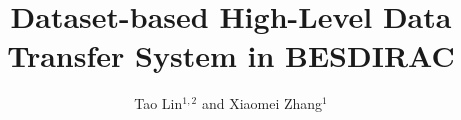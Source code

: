 \documentclass[a4paper]{jpconf}
\begin{document}
\title{Dataset-based High-Level Data Transfer System in BESDIRAC}

\author{Tao Lin$^{1,2}$ and Xiaomei Zhang$^1$}
\address{$^1$ Institute of High Energy Physics, Chinese Academy of Sciences}
\address{$^2$ University of Chinese Academy Sciences}










\end{document}
